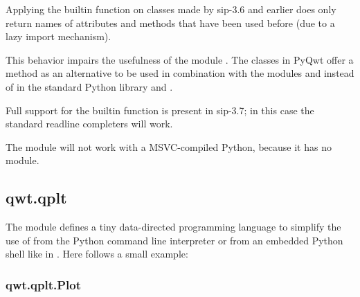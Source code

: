 \documentclass{manual}
\begin{document}
\begin{notice}[warning]
  Applying the builtin function  on classes made by sip-3.6
  and earlier does only return names of attributes and methods that have
  been used before (due to a lazy import mechanism).

  This behavior impairs the usefulness of the module .
  The classes in PyQwt offer a method  as an
  alternative to be used in combination with the modules
   and  instead of
   in the standard Python library and
  .

  Full support for the builtin function  is present in
  sip-3.7; in this case the standard readline completers will work. 
\end{notice}

\begin{notice}[warning]
  The module  will not work with a MSVC-compiled Python, because
  it has no  module.
\end{notice}


\subsection{qwt.qplt \label{qwt-qplt}}

The module  defines a tiny data-directed programming
language to simplify the use of  from the Python command
line interpreter or from an embedded Python shell like in .
Here follows a small example:



\subsubsection{qwt.qplt.Plot \label{intro-qplt-plot}}
\end{document}

